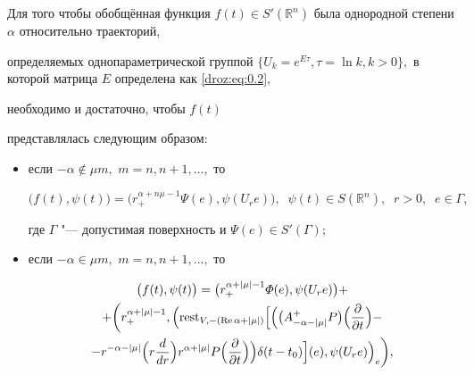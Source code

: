 \begin{theorem}[3] Для того чтобы обобщённая функция $f(t)\in S'(\mathbb R^n)$ была однородной степени $\alpha$ относительно траекторий{\rm,}

определяемых однопараметрической группой $\{U_k=e^{E\tau}, \tau=\ln k, k>0\},$ в которой матрица $E$ определена как \eqref{droz:eq:0.2}{\rm,}

 необходимо и достаточно{\rm,} чтобы $f(t)$

представлялась следующим образом\/{\rm:}

\begin{itemize}

\item[\rm1)] если $-\alpha \notin \mu m ,$ $m=n, n+1, \dots,$ то

\begin{equation*}


\bigl(f(t),\psi(t)\bigr)=\bigl(r_{+}^{\alpha +n\mu-1} \varPsi(e),\psi(U_re)\bigr), \;\; \psi(t) \in S(\mathbb R^n),\;\; r>0,\;\;e \in \Gamma,

\end{equation*}

где $\Gamma$ "--- допустимая поверхность и $\varPsi(e) \in S'(\Gamma);$



\item[\rm2)]  если $-\alpha \in \mu m,$ $ m=n, n+1, \dots,$ то

\begin{multline}

\label{droz:eq:2.26}

\bigl(f(t),\psi(t)\bigr)=\bigl(r_{+}^{\alpha +|\mu|-1} \varPhi(e), \psi(U_re)\bigr) + \\ +

 \biggl( r_{+}^{\alpha +|\mu|-1}, \Bigl(  {\rm rest}_{V,-({\rm Re\,} \alpha +|\mu|)}

 \Bigl[

\Bigl( \bigl(A_{-\alpha-|\mu|}^{+}P\bigr) \Bigl(\frac{\partial}{\partial t}\Bigr)-

 \\ -

r^{-\alpha-|\mu|} \Bigl(r\frac{d}{dr}\Bigr)r^{\alpha +|\mu|}P\Bigl(\frac{\partial}{\partial t}\Bigr)\Bigr)

\delta(t-t_0)\Bigr](e),\psi(U_re)\Bigr)_e \biggr),

\end{multline}


\end{itemize}
\end{theorem}
